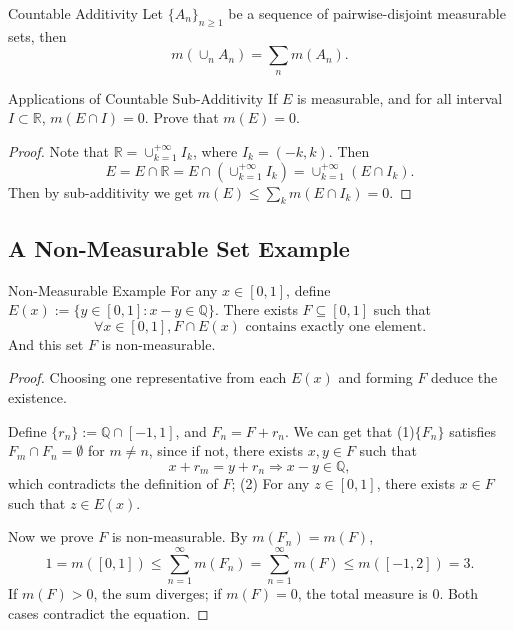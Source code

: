 \begin{theorem}{Countable Additivity}{}
  Let $\{A_n\}_{n \geq 1}$ be a sequence of pairwise-disjoint measurable sets, then
  \begin{equation}
    m(\cup _n A_n) = \sum\limits_n m(A_n).
  \end{equation}
\end{theorem}

\begin{example}{Applications of Countable Sub-Additivity}{}
  If $E$ is measurable, and for all interval $I \subset \mathbb{R}$, $m(E \cap I) = 0$.
  Prove that $m(E) = 0$.
\end{example}

\begin{proof}
  Note that $\mathbb{R} = \cup _{k = 1}^{+\infty} I_k$, where $I_k = (-k, k)$.
  Then
  \begin{equation}
    E = E \cap \mathbb{R} = E \cap (\cup _{k = 1}^{+\infty} I_k) = \cup _{k = 1}^{+\infty} (E \cap I_k).
  \end{equation}
  Then by sub-additivity we get $m(E) \leq \sum_k m(E \cap I_k) = 0$.
\end{proof}

\subsection{A Non-Measurable Set Example}

\begin{example}{Non-Measurable Example}{}
  For any $x \in [0, 1]$, define $E(x) := \{y \in [0, 1]: x - y \in \mathbb{Q}\}$.
  There exists $F \subseteq [0, 1]$ such that
  \begin{equation}
    \forall x \in [0, 1], F \cap E(x) \text{ contains exactly one element}.
  \end{equation}
  And this set $F$ is non-measurable.
\end{example}

\begin{proof}
  Choosing one representative from each $E(x)$ and forming $F$ deduce the existence.

  Define $\{r_n\} := \mathbb{Q} \cap [-1, 1]$, and $F_n = F + r_n$.
  We can get that
  (1)$\{F_n\}$ satisfies $F_m \cap F_n = \emptyset$ for $m \neq n$, since if not,
  there exists $x, y \in F$ such that
  \begin{equation}
    x + r_m = y + r_n \Rightarrow x - y \in \mathbb{Q},
  \end{equation}
  which contradicts the definition of $F$;
  (2) For any $z \in [0, 1]$, there exists $x \in F$ such that $z \in E(x)$.

  Now we prove $F$ is non-measurable. By $m(F_n) = m(F)$,
  \begin{equation}
    1 = m([0, 1]) \leq \sum\limits_{n = 1}^{\infty} m(F_n)
    = \sum\limits_{n = 1}^{\infty} m(F) \leq m([-1, 2]) = 3.
  \end{equation}
  If $m(F) > 0$, the sum diverges; if $m(F) = 0$, the total measure is $0$.
  Both cases contradict the equation.
\end{proof}

